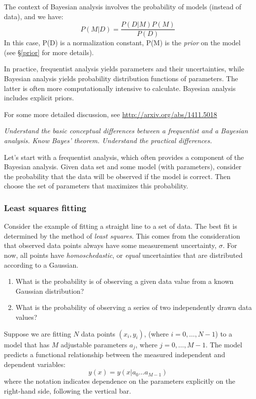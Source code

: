 \documentclass{article}
\newcommand{\test}[1]{%
    \begin{center}
        \colorbox{hl}{\parbox{0.9\textwidth}{\emph{\centering #1}}}
    \end{center}}
\newcommand{\mynotes}[1]{%
    \textcolor{myGreen}{\fontfamily{phv}\selectfont #1}
    }
\begin{document}
The context of Bayesian analysis involves the probability of models
(instead of data), and we have:
\[
    P(M|D) = \frac{P(D|M)P(M)}{P(D)}
    \]
In this case, P(D) is a normalization constant, P(M) is the
\textit{prior} on the model (see \S\ref{prior} for more details).

In practice, frequentist analysis yields parameters and their
uncertainties, while Bayesian analysis yields probability distribution
functions of parameters. The latter is often more computationally
intensive to calculate. Bayesian analysis includes explicit priors.

For some more detailed discussion, see
\url{http://arxiv.org/abs/1411.5018}

\test{Understand the basic conceptual differences between a frequentist
and a Bayesian analysis. Know Bayes' theorem. Understand the practical
differences.}

Let's start with a frequentist analysis, which often provides a component of
the Bayesian analysis. Given data set and some model (with
parameters), consider the probability that the data will be observed if the
model is correct. Then choose the set of parameters that maximizes this
probability.

\subsubsection{Least squares fitting}
Consider the example of fitting a straight line to a set of data. The best fit
is determined by the method of \textit{least squares}. This comes from the
consideration that observed data points always have some measurement
uncertainty, $\sigma$.
For now, all points have \textit{homoschedastic}, or
\textit{equal} uncertainties that are distributed according to a Gaussian.
\begin{enumerate}
    \item What is the probability is of observing a given data value from a
        known Gaussian distribution?
    \item What is the probability of observing a
        series of two independently drawn data values?
\end{enumerate}

\mynotes{
    Suppose we are fitting $N$ data points $(x_{i},y_{i})$,
    (where $i=0,\ldots,N-1$) to a model
    that has $M$ adjustable parameters $a_{j}$, where $j=0,\ldots,M-1$.
    The model predicts a functional relationship between the measured
    independent and dependent variables:
    \[
        y(x) = y(x|a_{0} \ldots a_{M-1})
        \]
    where the notation indicates dependence on the parameters explicitly on the
    right-hand side, following the vertical bar.
}
\end{document}
